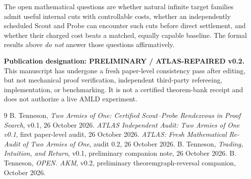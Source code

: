 \documentclass[11pt,letterpaper]{article}
\theoremstyle{definition}
\begin{document}
The open mathematical questions are whether natural infinite target families
admit useful internal cuts with controllable costs, whether an independently
scheduled Scout and Probe can encounter such cuts before direct settlement,
and whether their charged cost beats a matched, equally capable baseline.
The formal results above \emph{do not} answer those questions affirmatively.

\textbf{Publication designation: PRELIMINARY / ATLAS-REPAIRED v0.2.}
This manuscript has undergone a fresh paper-level consistency pass after
editing, but not mechanical proof verification, independent third-party
refereeing, implementation, or benchmarking. It is not a certified theorem-bank
receipt and does not authorize a live AMLD experiment.

\begin{thebibliography}{9}\setlength{\itemsep}{1.5pt}
 B. Tenneson, \emph{Two Armies of One: Certified Scout--Probe Rendezvous in Proof Search}, v0.1, 26 October 2026.
 \emph{ATLAS Independent Audit: Two Armies of One v0.1}, first paper-level audit, 26 October 2026.
 \emph{ATLAS: Fresh Mathematical Re-Audit of Two Armies of One}, audit 0.2, 26 October 2026.
 B. Tenneson, \emph{Trading, Intuition, and Return}, v0.1, preliminary companion note, 26 October 2026.
 B. Tenneson, \emph{OPEN. AKM}, v0.2, preliminary theoremgraph-reversal companion, October 2026.
\end{thebibliography}
\end{document}
